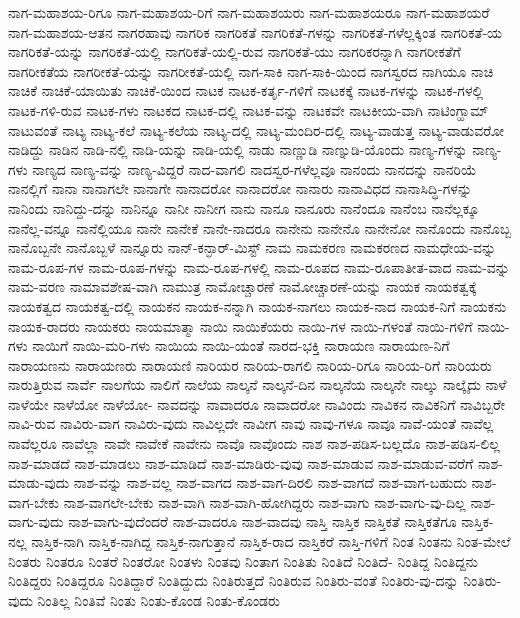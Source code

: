 {ನಾಗ-ಮಹಾಶಯ-ರಿಗೂ
ನಾಗ-ಮಹಾಶಯ-ರಿಗೆ
ನಾಗ-ಮಹಾಶಯರು
ನಾಗ-ಮಹಾಶಯರೂ
ನಾಗ-ಮಹಾಶಯರೆ
ನಾಗ-ಮಹಾಶಯ-ಆತನ
ನಾಗರಹಾವು
ನಾಗರಿಕ
ನಾಗರಿಕತೆ
ನಾಗರಿಕತೆ-ಗಳನ್ನು
ನಾಗರಿಕತೆ-ಗಳೆಲ್ಲಕ್ಕಿಂತ
ನಾಗರಿಕತೆ-ಯ
ನಾಗರಿಕತೆ-ಯನ್ನು
ನಾಗರಿಕತೆ-ಯಲ್ಲಿ
ನಾಗರಿಕತೆ-ಯಲ್ಲಿ-ರುವ
ನಾಗರಿಕತೆ-ಯು
ನಾಗರಿಕರನ್ನಾಗಿ
ನಾಗರೀಕತೆಗೆ
ನಾಗರೀಕತೆಯ
ನಾಗರೀಕತೆ-ಯನ್ನು
ನಾಗರೀಕತೆ-ಯಲ್ಲಿ
ನಾಗ-ಸಾಕಿ
ನಾಗ-ಸಾಕಿ-ಯಿಂದ
ನಾಗಸ್ವರದ
ನಾಗಿಯೂ
ನಾಚಿ
ನಾಚಿಕೆ
ನಾಚಿಕೆ-ಯಾಯಿತು
ನಾಚಿಕೆ-ಯಿಂದ
ನಾಟಕ
ನಾಟಕ-ಕರ್ತೃ-ಗಳಿಗೆ
ನಾಟಕಕ್ಕೆ
ನಾಟಕ-ಗಳನ್ನು
ನಾಟಕ-ಗಳಲ್ಲಿ
ನಾಟಕ-ಗಳಿ-ರುವ
ನಾಟಕ-ಗಳು
ನಾಟಕದ
ನಾಟಕ-ದಲ್ಲಿ
ನಾಟಕ-ವನ್ನು
ನಾಟಕವೇ
ನಾಟಕೀಯ-ವಾಗಿ
ನಾಟಿಂಗ್ಹಾಮ್
ನಾಟುವಂತೆ
ನಾಟ್ಯ
ನಾಟ್ಯ-ಕಲೆ
ನಾಟ್ಯ-ಕಲೆಯ
ನಾಟ್ಯ-ದಲ್ಲಿ
ನಾಟ್ಯ-ಮಂದಿರ-ದಲ್ಲಿ
ನಾಟ್ಯ-ವಾಡುತ್ತ
ನಾಟ್ಯ-ವಾಡುವರೋ
ನಾಡಿದ್ದು
ನಾಡಿನ
ನಾಡಿ-ನಲ್ಲಿ
ನಾಡಿ-ಯನ್ನು
ನಾಡಿ-ಯಲ್ಲಿ
ನಾಡು
ನಾಣ್ಣುಡಿ
ನಾಣ್ನುಡಿ-ಯೊಂದು
ನಾಣ್ಯ-ಗಳನ್ನು
ನಾಣ್ಯ-ಗಳು
ನಾಣ್ಯದ
ನಾಣ್ಯ-ವನ್ನು
ನಾಣ್ಯ-ವಿದ್ದರೆ
ನಾದ-ವಾಗಲಿ
ನಾದಸ್ವರ-ಗಳೆಲ್ಲವೂ
ನಾನಂದು
ನಾನದನ್ನು
ನಾನರಿಯೆ
ನಾನಲ್ಲಿಗೆ
ನಾನಾ
ನಾನಾಗಲೇ
ನಾನಾಗೇ
ನಾನಾದರೋ
ನಾನಾದರೋ
ನಾನಾರು
ನಾನಾವಿಧದ
ನಾನಾಸಿದ್ಧಿ-ಗಳನ್ನು
ನಾನಿಂದು
ನಾನಿದ್ದು-ದನ್ನು
ನಾನಿನ್ನೂ
ನಾನೀ
ನಾನೀಗ
ನಾನು
ನಾನೂ
ನಾನೂರು
ನಾನೆಂದೂ
ನಾನೆಂಬ
ನಾನೆಲ್ಲಕ್ಕೂ
ನಾನೆಲ್ಲ-ವನ್ನೂ
ನಾನೆಲ್ಲಿಯೂ
ನಾನೇ
ನಾನೇಕೆ
ನಾನೇ-ನಾದರೂ
ನಾನೇನು
ನಾನೇನೊ
ನಾನೇನೋ
ನಾನೊಂದು
ನಾನೊಬ್ಬ
ನಾನೊಬ್ಬನೇ
ನಾನೊಬ್ಬಳೆ
ನಾನ್ನೂರು
ನಾನ್-ಕನ್ಫಾರ್-ಮಿಸ್ಟ್
ನಾಮ
ನಾಮಕರಣ
ನಾಮಕರಣದ
ನಾಮಧೇಯ-ವನ್ನು
ನಾಮ-ರೂಪ-ಗಳ
ನಾಮ-ರೂಪ-ಗಳನ್ನು
ನಾಮ-ರೂಪ-ಗಳಲ್ಲಿ
ನಾಮ-ರೂಪದ
ನಾಮ-ರೂಪಾತೀತ-ವಾದ
ನಾಮ-ವನ್ನು
ನಾಮ-ವರಣ
ನಾಮಾವಶೇಷ-ವಾಗಿ
ನಾಮುತ್ರ
ನಾಮೋಚ್ಚಾರಣೆ
ನಾಮೋಚ್ಚಾರಣೆ-ಯನ್ನು
ನಾಯಕ
ನಾಯಕತ್ವಕ್ಕೆ
ನಾಯಕತ್ವದ
ನಾಯಕತ್ವ-ದಲ್ಲಿ
ನಾಯಕನ
ನಾಯಕ-ನನ್ನಾಗಿ
ನಾಯಕ-ನಾಗಲು
ನಾಯಕ-ನಾದ
ನಾಯಕ-ನಿಗೆ
ನಾಯಕನು
ನಾಯಕ-ರಾದರು
ನಾಯಕರು
ನಾಯಮಾತ್ಮಾ
ನಾಯಿ
ನಾಯಿಕೆಯರು
ನಾಯಿ-ಗಳ
ನಾಯಿ-ಗಳಂತೆ
ನಾಯಿ-ಗಳಿಗೆ
ನಾಯಿ-ಗಳು
ನಾಯಿಗೆ
ನಾಯಿ-ಮರಿ-ಗಳು
ನಾಯಿಯ
ನಾಯಿ-ಯಂತೆ
ನಾರದ-ಭಕ್ತಿ
ನಾರಾಯಣ
ನಾರಾಯಣ-ನಿಗೆ
ನಾರಾಯಣನು
ನಾರಾಯಣರು
ನಾರಾಯಣಿ
ನಾರಿಯರ
ನಾರಿಯ-ರಾಗಲಿ
ನಾರಿಯ-ರಿಗೂ
ನಾರಿಯ-ರಿಗೆ
ನಾರಿಯರು
ನಾರುತ್ತಿರುವ
ನಾರ್ವೆ
ನಾಲಗೆಯ
ನಾಲಿಗೆ
ನಾಲೆಯ
ನಾಲ್ಕನೆ
ನಾಲ್ಕನೆ-ದಿನ
ನಾಲ್ಕನೆಯ
ನಾಲ್ಕನೇ
ನಾಲ್ಕು
ನಾಲ್ಕೈದು
ನಾಳೆ
ನಾಳೆಯೇ
ನಾಳೆಯೋ
ನಾಳೆಯೋ-
ನಾವದನ್ನು
ನಾವಾದರೂ
ನಾವಾದರೋ
ನಾವಿಂದು
ನಾವಿಕನ
ನಾವಿಕನಿಗೆ
ನಾವಿಬ್ಬರೇ
ನಾವಿ-ರುವ
ನಾವಿರು-ವಾಗ
ನಾವಿರು-ವುದು
ನಾವಿಲ್ಲದೇ
ನಾವೀಗ
ನಾವು
ನಾವು-ಗಳೂ
ನಾವೂ
ನಾವೆ-ಯಂತೆ
ನಾವೆಲ್ಲ
ನಾವೆಲ್ಲರೂ
ನಾವೆಲ್ಲಾ
ನಾವೇ
ನಾವೇಕೆ
ನಾವೇನು
ನಾವೊ
ನಾವೊಂದು
ನಾಶ
ನಾಶ-ಪಡಿಸ-ಬಲ್ಲದೊ
ನಾಶ-ಪಡಿಸ-ಲಿಲ್ಲ
ನಾಶ-ಮಾಡದೆ
ನಾಶ-ಮಾಡಲು
ನಾಶ-ಮಾಡಿದೆ
ನಾಶ-ಮಾಡಿರು-ವುವು
ನಾಶ-ಮಾಡುವ
ನಾಶ-ಮಾಡುವ-ವರೆಗೆ
ನಾಶ-ಮಾಡು-ವುದು
ನಾಶ-ವನ್ನು
ನಾಶ-ವಲ್ಲ
ನಾಶ-ವಾಗದ
ನಾಶ-ವಾಗ-ದಿರಲಿ
ನಾಶ-ವಾಗದೆ
ನಾಶ-ವಾಗ-ಬಹುದು
ನಾಶ-ವಾಗ-ಬೇಕು
ನಾಶ-ವಾಗಲೇ-ಬೇಕು
ನಾಶ-ವಾಗಿ
ನಾಶ-ವಾಗಿ-ಹೋಗಿದ್ದರು
ನಾಶ-ವಾಗು
ನಾಶ-ವಾಗು-ವು-ದಿಲ್ಲ
ನಾಶ-ವಾಗು-ವುದು
ನಾಶ-ವಾಗು-ವುದೆಂದರೆ
ನಾಶ-ವಾದರೂ
ನಾಶ-ವಾದವು
ನಾಸ್ತಿ
ನಾಸ್ತಿಕ
ನಾಸ್ತಿಕತೆ
ನಾಸ್ತಿಕತೆಗೂ
ನಾಸ್ತಿಕ-ನಲ್ಲ
ನಾಸ್ತಿಕ-ನಾಗಿ
ನಾಸ್ತಿಕ-ನಾಗಿದ್ದ
ನಾಸ್ತಿಕ-ನಾಗುತ್ತಾನೆ
ನಾಸ್ತಿಕ-ರಾದ
ನಾಸ್ತಿಕರೆ
ನಾಸ್ತಿ-ಗಳಿಗೆ
ನಿಂತ
ನಿಂತನು
ನಿಂತ-ಮೇಲೆ
ನಿಂತರು
ನಿಂತರೂ
ನಿಂತರೆ
ನಿಂತರೋ
ನಿಂತಳು
ನಿಂತವು
ನಿಂತಾಗ
ನಿಂತಿತು
ನಿಂತಿದೆ
ನಿಂತಿದೆ-
ನಿಂತಿದ್ದ
ನಿಂತಿದ್ದನು
ನಿಂತಿದ್ದರು
ನಿಂತಿದ್ದರೂ
ನಿಂತಿದ್ದಾರೆ
ನಿಂತಿದ್ದುದು
ನಿಂತಿರುತ್ತದೆ
ನಿಂತಿರುವ
ನಿಂತಿರು-ವಂತೆ
ನಿಂತಿರು-ವು-ದನ್ನು
ನಿಂತಿರು-ವುದು
ನಿಂತಿಲ್ಲ
ನಿಂತಿವೆ
ನಿಂತು
ನಿಂತು-ಕೊಂಡ
ನಿಂತು-ಕೊಂಡರು
}
